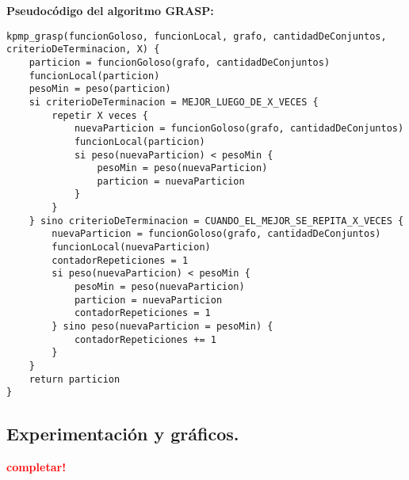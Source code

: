 \textbf{Pseudocódigo del algoritmo GRASP:}

\vspace*{0.1cm}

\begin{verbatim}
kpmp_grasp(funcionGoloso, funcionLocal, grafo, cantidadDeConjuntos, criterioDeTerminacion, X) {
    particion = funcionGoloso(grafo, cantidadDeConjuntos)
    funcionLocal(particion)
    pesoMin = peso(particion)
    si criterioDeTerminacion = MEJOR_LUEGO_DE_X_VECES {
        repetir X veces {
            nuevaParticion = funcionGoloso(grafo, cantidadDeConjuntos)
            funcionLocal(particion)
            si peso(nuevaParticion) < pesoMin {
                pesoMin = peso(nuevaParticion)
                particion = nuevaParticion
            }
        }
    } sino criterioDeTerminacion = CUANDO_EL_MEJOR_SE_REPITA_X_VECES {
        nuevaParticion = funcionGoloso(grafo, cantidadDeConjuntos)
        funcionLocal(nuevaParticion)
        contadorRepeticiones = 1
        si peso(nuevaParticion) < pesoMin {
            pesoMin = peso(nuevaParticion)
            particion = nuevaParticion
            contadorRepeticiones = 1
        } sino peso(nuevaParticion = pesoMin) {
            contadorRepeticiones += 1
        }
    }
    return particion
}
\end{verbatim}



\newpage
\subsection{Experimentación y gráficos.}
\vspace*{0.3cm}
\textcolor{red}{\textbf{completar!}}
